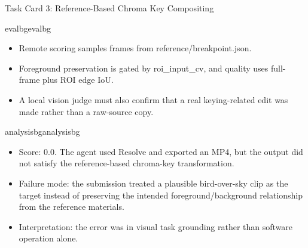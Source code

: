 \begin{ColorTaskCard}{Task Card 3: Reference-Based Chroma Key Compositing \hfill {}}
\begin{minipage}[t]{0.49\linewidth}
\end{minipage}\hfill
\begin{minipage}[t]{0.49\linewidth}
\vspace{0pt}
\begin{CardBlock}{evalbg}{evalbg}
\begin{itemize}
\item Remote scoring samples frames from reference/breakpoint.json.
\item Foreground preservation is gated by roi\_input\_cv, and quality uses full-frame plus ROI edge IoU.
\item A local vision judge must also confirm that a real keying-related edit was made rather than a raw-source copy.
\end{itemize}
\end{CardBlock}

\begin{CardBlock}{analysisbg}{analysisbg}
\begin{itemize}
\item Score: 0.0. The agent used Resolve and exported an MP4, but the output did not satisfy the reference-based chroma-key transformation.
\item Failure mode: the submission treated a plausible bird-over-sky clip as the target instead of preserving the intended foreground/background relationship from the reference materials.
\item Interpretation: the error was in visual task grounding rather than software operation alone.
\end{itemize}
\end{CardBlock}
\end{minipage}
\end{ColorTaskCard}
\clearpage
